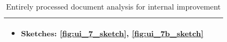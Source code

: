 \begin{table}[H]
\begin{tabularx}{0.75\linewidth}{||Sc|X||}
        \begin{minipage}[l]{\linewidth}
            \begin{itemize}[wide, labelindent=0pt]
                \vspace{4pt}
                \item Sketches: \ref{fig:ui_7_sketch}, \ref{fig:ui_7b_sketch}
                \vspace{4pt}
            \end{itemize}
        \end{minipage}  \\
        \hline
        \hline
    \end{tabularx}
    \caption{Entirely processed document analysis for internal improvement}
    \label{tab:use_case_internal}
\end{table}